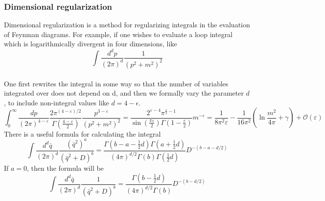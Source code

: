 \subsubsection{Dimensional regularization}
Dimensional regularization is a method for regularizing integrals in the evaluation of Feynman diagrams. For example, if one wishes to evaluate a loop integral which is logarithmically divergent in four dimensions, like
\[\int {\frac {d^{d}p}{(2\pi )^{d}}}{\frac {1}{\left(p^{2}+m^{2}\right)^{2}}}\]
\\
One first rewrites the integral in some way so that the number of variables integrated over does not depend on d, and then we formally vary the parameter $d$, to include non-integral values like $d=4-\epsilon$.
\[\int _{0}^{\infty }{\frac {dp}{(2\pi )^{4-\varepsilon }}}{\frac {2\pi ^{(4-\varepsilon )/2}}{\Gamma \left({\frac {4-\varepsilon }{2}}\right)}}{\frac {p^{3-\varepsilon }}{\left(p^{2}+m^{2}\right)^{2}}}={\frac {2^{\varepsilon -4}\pi ^{{\frac {\varepsilon }{2}}-1}}{\sin({\frac {\pi \varepsilon }{2}})\Gamma (1-{\frac {\varepsilon }{2}})}}m^{-\varepsilon }={\frac {1}{8\pi ^{2}\varepsilon }}-{\frac {1}{16\pi ^{2}}}\left(\ln {\frac {m^{2}}{4\pi }}+\gamma \right)+{\mathcal {O}}(\varepsilon )\]
There is a useful formula for calculating the integral
\[\int \frac{d^d \bar{q}}{(2\pi)^{d}} \frac{(\bar{q}^2)^a}{(\bar{q}^2+D)^b} = \frac{\Gamma(b-a-\frac{1}{2}d) \Gamma(a+\frac{1}{2}d)}{(4\pi)^{d/2} \Gamma(b) \Gamma(\frac{1}{2}d)} D^{-(b-a-d/2)}\]
If $a=0$, then the formula will be
\[\int \frac{d^d \bar{q}}{(2\pi)^{d}} \frac{1}{(\bar{q}^2+D)^b} = \frac{\Gamma(b-\frac{1}{2}d)}{(4\pi)^{d/2} \Gamma(b)} D^{-(b-d/2)}\]


